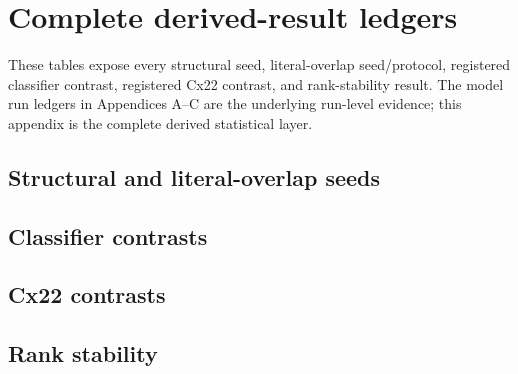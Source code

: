 \chapter{Complete derived-result ledgers}\label{s1:ch:app09_complete_derived_result_ledgers}

These tables expose every structural seed, literal-overlap seed/protocol, registered classifier contrast, registered Cx22 contrast, and rank-stability result. The model run ledgers in Appendices A--C are the underlying run-level evidence; this appendix is the complete derived statistical layer.

\section{Structural and literal-overlap seeds}

{\small
\setlength{\tabcolsep}{3pt}


}

\begin{landscape}
\section{Classifier contrasts}
\scriptsize
\setlength{\tabcolsep}{3pt}

\end{landscape}

\begin{landscape}
\section{Cx22 contrasts}
\scriptsize
\setlength{\tabcolsep}{3pt}

\end{landscape}

\section{Rank stability}

{\scriptsize
\setlength{\tabcolsep}{3pt}

}
